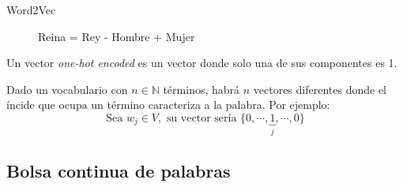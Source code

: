 \documentclass{beamer}
\begin{document}
\begin{frame}{Word2Vec}
	\begin{figure}[ht]
		\centering
		\caption{Reina = Rey - Hombre + Mujer}
	\end{figure}
\end{frame}

\begin{frame}
	\begin{definition}
		Un vector \textit{one-hot encoded} es un vector donde solo una de sus componentes es 1.
	\end{definition}
	Dado un vocabulario con $n\in\mathbb{N}$ términos, habrá $n$ vectores diferentes donde el íncide
	que ocupa un término caracteriza a la palabra. Por ejemplo:
	\begin{equation}
		\text{Sea } w_j\in V, \text{ su vector sería } \{0, \cdots, \underbrace{1}_{j}, \cdots, 0\}
	\end{equation}

\end{frame}

\subsection{Bolsa continua de palabras}
\end{document}
